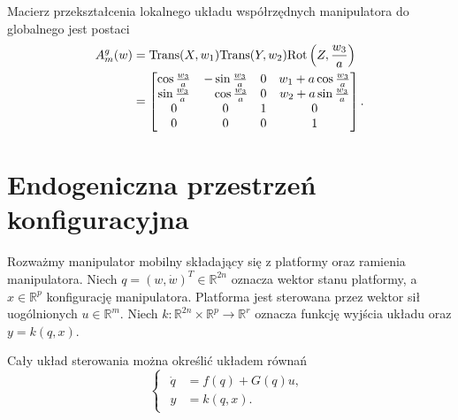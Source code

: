 Macierz przekształcenia lokalnego układu współrzędnych manipulatora do globalnego jest postaci
\begin{equation}
\begin{aligned}
A_m^g(w)&=\mathrm{Trans}(X, w_1)\mathrm{Trans}(Y, w_2)\mathrm{Rot}\left(Z, \frac{w_3}{a}\right)\\
&= \begin{bmatrix}
\cos \frac{w_3}{a} & -\sin \frac{w_3}{a} & 0 & w_1+a\cos \frac{w_3}{a}\\
\sin \frac{w_3}{a} & \phantom{-}\cos \frac{w_3}{a} & 0 & w_2+a\sin \frac{w_3}{a}\\
0 & 0 & 1 & 0\\
0 & 0 & 0 & 1
\end{bmatrix}.
\end{aligned}
\end{equation}

\section{Endogeniczna przestrzeń konfiguracyjna}
Rozważmy manipulator mobilny składający się z platformy oraz ramienia manipulatora. Niech $q = (w, \dot w)^T \in \mathbb{R}^{2n}$ oznacza wektor stanu platformy, a $x \in \mathbb{R}^p$ konfigurację manipulatora. Platforma jest sterowana przez wektor sił uogólnionych $u \in \mathbb{R}^m$. Niech $k: \mathbb{R}^{2n} \times \mathbb{R}^p \rightarrow \mathbb{R}^r$ oznacza funkcję wyjścia układu oraz $y=k(q,x)$.

Cały układ sterowania można określić układem równań
\begin{equation}
\begin{cases}
\begin{aligned}
\label{eq:control_sys}
\dot q &= f(q) + G(q)u,\\
y &= k(q, x).
\end{aligned}
\end{cases}
\end{equation}

